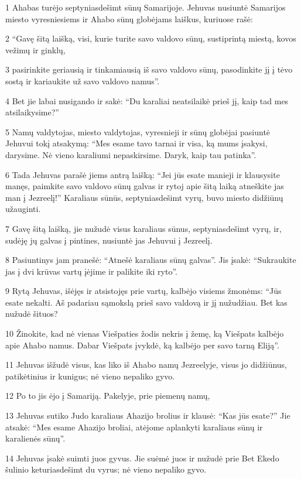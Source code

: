 \par 1 Ahabas turėjo septyniasdešimt sūnų Samarijoje. Jehuvas nusiuntė Samarijos miesto vyresniesiems ir Ahabo sūnų globėjams laiškus, kuriuose rašė: 
\par 2 “Gavę šitą laišką, visi, kurie turite savo valdovo sūnų, sustiprintą miestą, kovos vežimų ir ginklų, 
\par 3 pasirinkite geriausią ir tinkamiausią iš savo valdovo sūnų, pasodinkite jį į tėvo sostą ir kariaukite už savo valdovo namus”. 
\par 4 Bet jie labai nusigando ir sakė: “Du karaliai neatsilaikė prieš jį, kaip tad mes atsilaikysime?” 
\par 5 Namų valdytojas, miesto valdytojas, vyresnieji ir sūnų globėjai pasiuntė Jehuvui tokį atsakymą: “Mes esame tavo tarnai ir visa, ką mums įsakysi, darysime. Nė vieno karaliumi nepaskirsime. Daryk, kaip tau patinka”. 
\par 6 Tada Jehuvas parašė jiems antrą laišką: “Jei jūs esate manieji ir klausysite manęs, paimkite savo valdovo sūnų galvas ir rytoj apie šitą laiką atneškite jas man į Jezreelį!” Karaliaus sūnūs, septyniasdešimt vyrų, buvo miesto didžiūnų užauginti. 
\par 7 Gavę šitą laišką, jie nužudė visus karaliaus sūnus, septyniasdešimt vyrų, ir, sudėję jų galvas į pintines, nusiuntė jas Jehuvui į Jezreelį. 
\par 8 Pasiuntinys jam pranešė: “Atnešė karaliaus sūnų galvas”. Jis įsakė: “Sukraukite jas į dvi krūvas vartų įėjime ir palikite iki ryto”. 
\par 9 Rytą Jehuvas, išėjęs ir atsistojęs prie vartų, kalbėjo visiems žmonėms: “Jūs esate nekalti. Aš padariau sąmokslą prieš savo valdovą ir jį nužudžiau. Bet kas nužudė šituos? 
\par 10 Žinokite, kad nė vienas Viešpaties žodis nekris į žemę, ką Viešpats kalbėjo apie Ahabo namus. Dabar Viešpats įvykdė, ką kalbėjo per savo tarną Eliją”. 
\par 11 Jehuvas išžudė visus, kas liko iš Ahabo namų Jezreelyje, visus jo didžiūnus, patikėtinius ir kunigus; nė vieno nepaliko gyvo. 
\par 12 Po to jis ėjo į Samariją. Pakelyje, prie piemenų namų, 
\par 13 Jehuvas sutiko Judo karaliaus Ahazijo brolius ir klausė: “Kas jūs esate?” Jie atsakė: “Mes esame Ahazijo broliai, atėjome aplankyti karaliaus sūnų ir karalienės sūnų”. 
\par 14 Jehuvas įsakė suimti juos gyvus. Jie suėmė juos ir nužudė prie Bet Ekedo šulinio keturiasdešimt du vyrus; nė vieno nepaliko gyvo. 
